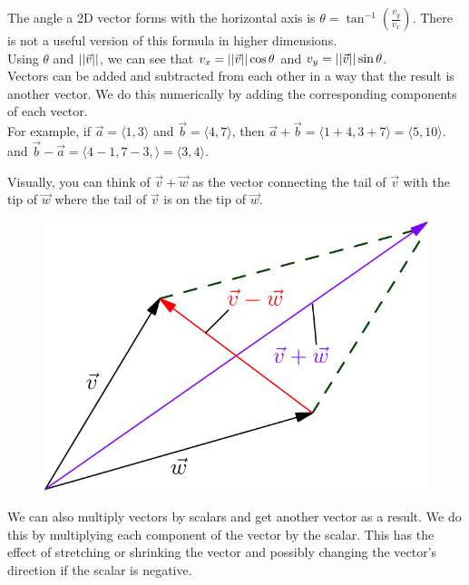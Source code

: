 \noindent
The angle a 2D vector forms with the horizontal axis is $\theta = \tan^{-1}{\left(\frac{v_y}{v_x}\right)}$. There is not a useful version of this formula in higher dimensions.\\
Using $\theta$ and $\left|\left|\vec{v}\right|\right|$, we can see that $v_x = \left|\left|\vec{v}\right|\right|\cos{\theta}$ and $v_y = \left|\left|\vec{v}\right|\right|\sin{\theta}$.\\

\noindent
Vectors can be added and subtracted from each other in a way that the result is another vector. We do this numerically by adding the corresponding components of each vector.\\
For example, if $\vec{a} = \langle 1,3 \rangle$ and $\vec{b} = \langle 4,7 \rangle$, then $\vec{a}+\vec{b} = \langle 1+4, 3+7 \rangle = \langle 5,10 \rangle$.\\
and $\vec{b}-\vec{a} = \langle 4-1, 7-3, \rangle = \langle 3,4 \rangle$.

\noindent
Visually, you can think of $\vec{v}+\vec{w}$ as the vector connecting the tail of $\vec{v}$ with the tip of $\vec{w}$ where the tail of $\vec{v}$ is on the tip of $\vec{w}$.

\begin{figure}[h]
	\centering
	\includegraphics[scale=0.33]{Images/backgroundReview/Parallelogram}
\end{figure}

\noindent
We can also multiply vectors by scalars and get another vector as a result. We do this by multiplying each component of the vector by the scalar. This has the effect of stretching or shrinking the vector and possibly changing the vector's direction if the scalar is negative.

